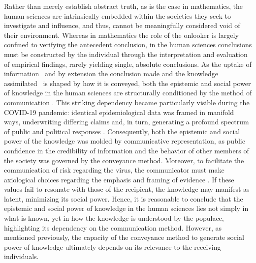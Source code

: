 \documentclass[12pt]{article}
\begin{document}
Rather than merely establish abstract truth, as is the case in mathematics, the human sciences are intrinsically embedded within the societies they seek to investigate and influence, and thus, cannot be meaningfully considered void of their environment. Whereas in mathematics the role of the onlooker is largely confined to verifying the antecedent conclusion, in the human sciences conclusions must be constructed by the individual through the interpretation and evaluation of empirical findings, rarely yielding single, absolute conclusions. As the uptake of information \textemdash\ and by extension the conclusion made and the knowledge assimilated \textemdash\ is shaped by how it is conveyed, both the epistemic and social power of knowledge in the human sciences are structurally conditioned by the method of communication \parencite{Tversky1985}. This striking dependency became particularly visible during the COVID-19 pandemic: identical epidemiological data was framed in manifold ways, underwriting differing claims and, in turn, generating a profound spectrum of public and political responses \parencite{Teschendorf09102024}. Consequently, both the epistemic and social power of the knowledge was molded by communicative representation, as public confidence in the credibility of information and the behavior of other members of the society was governed by the conveyance method. Moreover, to facilitate the communication of risk regarding the virus, the communicator must make axiological choices regarding the emphasis and framing of evidence \parencites{WuJohn2021RiskCommunication, Gigerenzer2007StatisticalLiteracy}. If these values fail to resonate with those of the recipient, the knowledge may manifest as latent, minimizing its social power. Hence, it is reasonable to conclude that the epistemic and social power of knowledge in the human sciences lies not simply in what is known, yet in how the knowledge is understood by the populace, highlighting its dependency on the communication method.  However, as mentioned previously, the capacity of the conveyance method to generate social power of knowledge ultimately depends on its relevance to the receiving individuals.  
\end{document}
